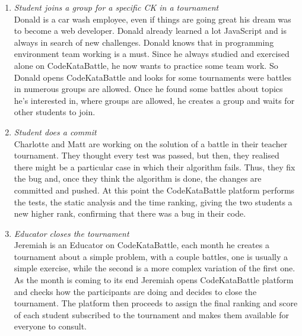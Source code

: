 \documentclass[12pt, a4paper]{report}
\begin{document}
\begin{enumerate}
        \item \textit{Student joins a group for a specific CK in a tournament}\\
            Donald is a car wash employee, even if things are going great his dream was to become a web developer.
            Donald already learned a lot JavaScript and is always in search of new challenges.
            Donald knows that in programming environment team working is a must.
            Since he always studied and exercised alone on CodeKataBattle, he now wants to practice some team work.
            So Donald opens CodeKataBattle and looks for some tournaments were battles in numerous groups are allowed.
            Once he found some battles about topics he's interested in, where groups are allowed, he creates a group and waits for other students to join.
        \item \textit{Student does a commit} \\
            Charlotte and Matt are working on the solution of a battle in their teacher tournament.
            They thought every test was passed, but then, they realised there might be a particular case in which their algorithm fails.
            Thus, they fix the bug and, once they think the algorithm is done, the changes are committed and pushed.
            At this point the CodeKataBattle platform performs the tests, the static analysis and the time ranking, giving the two students a new higher rank, confirming that there was a bug in their code.
        \item \textit{Educator closes the tournament} \\
            Jeremiah is an Educator on CodeKataBattle, each month he creates a tournament about a simple problem, with a couple battles,
            one is usually a simple exercise, while the second is a more complex variation of the first one.
            As the month is coming to its end Jeremiah opens CodeKataBattle platform and checks how the participants are doing and decides to close the tournament.
            The platform then proceeds to assign the final ranking and score of each student subscribed to the tournament and makes them available for everyone to consult. 
    \end{enumerate}
\end{document}
